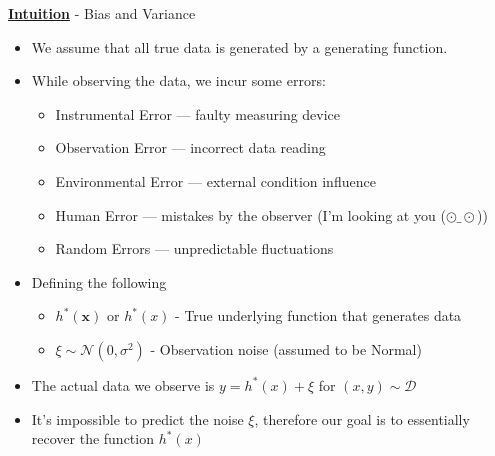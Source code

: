 \documentclass{beamer}
\begin{document}
\begin{frame}{\underline{\textbf{Intuition}} - Bias and Variance}
    \begin{itemize}
        \item We assume that all true data is generated by a generating function.
        \item While observing the data, we incur some errors:
        \begin{itemize}
            \item Instrumental Error — faulty measuring device
            \item Observation Error — incorrect data reading
            \item Environmental Error — external condition influence
            \item Human Error — mistakes by the observer (I'm looking at you ($\odot \_ \odot$))
            \item Random Errors — unpredictable fluctuations
        \end{itemize}
    \item Defining the following
    \begin{itemize}
        \item $h^*(\mathbf{x})$ or $h^*(x)$ - True underlying function that generates data
        \item $\xi \sim \mathcal{N}(0, \sigma^2)$ - Observation noise (assumed to be Normal)
    \end{itemize}
    \item The actual data we observe is $y = h^*(x) + \xi$ for $(x,y) \sim \mathcal{D}$ 

    \item It's impossible to predict the noise $\xi$, therefore our goal is to essentially recover the function $h^*(x)$
        
    \end{itemize}
\end{frame}
\end{document}
